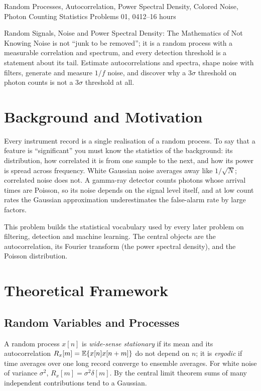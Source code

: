 \documentclass[11pt,a4paper]{article}
\begin{document}
%
{Random Processes, Autocorrelation, Power Spectral Density, Colored Noise, Photon Counting Statistics}%
{Problems 01, 04}{12--16 hours}

\begin{summarybox}{Random Signals, Noise and Power Spectral Density: The Mathematics of Not Knowing}
Noise is not ``junk to be removed''; it is a random process with a measurable correlation and spectrum, and every detection threshold is a statement about its tail. Estimate autocorrelations and spectra, shape noise with filters, generate and measure $1/f$ noise, and discover why a $3\sigma$ threshold on photon counts is not a $3\sigma$ threshold at all.
\end{summarybox}


\section*{Background and Motivation}
Every instrument record is a single realisation of a random process. To say that a feature is ``significant'' you must know the statistics of the background: its distribution, how correlated it is from one sample to the next, and how its power is spread across frequency. White Gaussian noise averages away like $1/\sqrt N$; correlated noise does not. A gamma-ray detector counts photons whose arrival times are Poisson, so its noise depends on the signal level itself, and at low count rates the Gaussian approximation underestimates the false-alarm rate by large factors.

This problem builds the statistical vocabulary used by every later problem on filtering, detection and machine learning. The central objects are the autocorrelation, its Fourier transform (the power spectral density), and the Poisson distribution.

\section*{Theoretical Framework}
\subsection{Random Variables and Processes}
A random process $x[n]$ is \emph{wide-sense stationary} if its mean and its autocorrelation $R_x[m]=\mathbb{E}\{x[n]x[n+m]\}$ do not depend on $n$; it is \emph{ergodic} if time averages over one long record converge to ensemble averages. For white noise of variance $\sigma^2$, $R_x[m]=\sigma^2\delta[m]$. By the central limit theorem sums of many independent contributions tend to a Gaussian.
\end{document}
